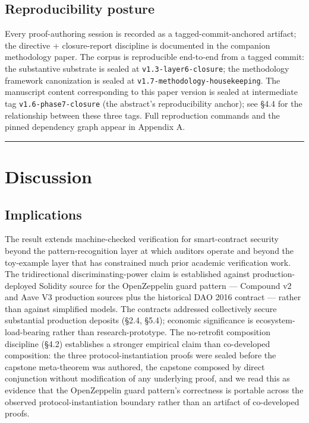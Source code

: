 \subsection{Reproducibility posture}\label{reproducibility-posture}

Every proof-authoring session is recorded as a tagged-commit-anchored
artifact; the directive + closure-report discipline is documented in the
companion methodology paper. The corpus is reproducible end-to-end from
a tagged commit: the substantive substrate is sealed at
\texttt{v1.3-layer6-closure}; the methodology framework canonization is
sealed at \texttt{v1.7-methodology-housekeeping}. The manuscript content
corresponding to this paper version is sealed at intermediate tag
\texttt{v1.6-phase7-closure} (the abstract's reproducibility anchor);
see §4.4 for the relationship between these three tags. Full
reproduction commands and the pinned dependency graph appear in Appendix
A.

\begin{center}\rule{0.5\linewidth}{0.5pt}\end{center}

\section{Discussion}\label{discussion}

\subsection{Implications}\label{implications}

The result extends machine-checked verification for smart-contract
security beyond the pattern-recognition layer at which auditors operate
and beyond the toy-example layer that has constrained much prior
academic verification work. The tridirectional discriminating-power
claim is established against production-deployed Solidity source for the
OpenZeppelin guard pattern --- Compound v2 and Aave V3 production
sources plus the historical DAO 2016 contract --- rather than against
simplified models. The contracts addressed collectively secure
substantial production deposits (§2.4, §5.4); economic significance is
ecosystem-load-bearing rather than research-prototype. The no-retrofit
composition discipline (§4.2) establishes a stronger empirical claim
than co-developed composition: the three protocol-instantiation proofs
were sealed before the capstone meta-theorem was authored, the capstone
composed by direct conjunction without modification of any underlying
proof, and we read this as evidence that the OpenZeppelin guard
pattern's correctness is portable across the observed
protocol-instantiation boundary rather than an artifact of co-developed
proofs.


